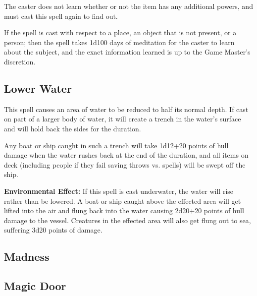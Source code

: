 \begin{multicols*}{2}
The caster does not learn whether or not the item has any additional powers, and must cast this spell again to find out.

If the spell is cast with respect to a place, an object that is not present, or a person; then the spell takes 1d100 days of meditation for the caster to learn about the subject, and the exact information learned is up to the Game Master’s discretion.

\subsection{Lower Water}\label{spell:Lower Water}

This spell causes an area of water to be reduced to half its normal depth. If cast on part of a larger body of water, it will create a trench in the water’s surface and will hold back the sides for the duration.

Any boat or ship caught in such a trench will take 1d12+20 points of hull damage when the water rushes back at the end of the duration, and all items on deck (including people if they fail saving throws vs. spells) will be swept off the ship.

\textbf{Environmental Effect:} If this spell is cast underwater, the water will rise rather than be lowered. A boat or ship caught above the effected area will get lifted into the air and flung back into the water causing 2d20+20 points of hull damage to the vessel. Creatures in the effected area will also get flung out to sea, suffering 3d20 points of damage.

\subsection{Madness}\label{spell:Madness}


\subsection{Magic Door}\label{spell:Magic Door}
\end{multicols*}
